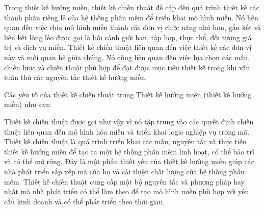 
Trong thiết kế hướng miền, thiết kế chiến thuật đề cập đến quá trình thiết kế các thành phần riêng lẻ của hệ thống phần mềm để triển khai mô hình miền. Nó liên quan đến việc chia mô hình miền thành các đơn vị chức năng nhỏ hơn, gắn kết và liên kết lỏng lẻo được gọi là bối cảnh giới hạn, tập hợp, thực thể, đối tượng giá trị và dịch vụ miền. Thiết kế chiến thuật liên quan đến việc thiết kế các đơn vị này và mối quan hệ giữa chúng. Nó cũng liên quan đến việc lựa chọn các mẫu, chiến lược và chiến thuật phù hợp để đạt được mục tiêu thiết kế trong khi vẫn tuân thủ các nguyên tắc thiết kế hướng miền.

Các yếu tố của thiết kế chiến thuật trong Thiết kế hướng miền (thiết kế hướng miền) như sau:










Thiết kế chiến thuật được gọi như vậy vì nó tập trung vào các quyết định chiến thuật liên quan đến mô hình hóa miền và triển khai logic nghiệp vụ trong mã. Thiết kế chiến thuật là quá trình triển khai các mẫu, nguyên tắc và thực tiễn thiết kế hướng miền để tạo ra một hệ thống phần mềm linh hoạt, có thể bảo trì và có thể mở rộng. Đây là một phần thiết yếu của thiết kế hướng miền giúp các nhà phát triển sắp xếp mã của họ và cải thiện chất lượng của hệ thống phần mềm. Thiết kế chiến thuật cung cấp một bộ nguyên tắc và phương pháp hay nhất mà nhà phát triển có thể làm theo để tạo mô hình miền phù hợp với yêu cầu kinh doanh và có thể phát triển theo thời gian.

